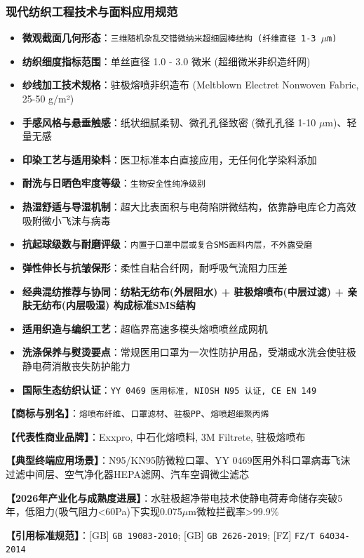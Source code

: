 \documentclass[11pt,openright,twoside,UTF8]{ctexbook}
\begin{document}
\subsubsection*{现代纺织工程技术与面料应用规范}
\begin{itemize} \setlength{\itemsep}{2pt}
    \item \textbf{微观截面几何形态}：\texttt{三维随机杂乱交错微纳米超细圆棒结构 (纤维直径 1-3 $\mu$m)}
    \item \textbf{纺织细度指标范围}：单丝直径 1.0 - 3.0 微米 (超细微米非织造纤网)
    \item \textbf{纱线加工技术规格}：驻极熔喷非织造布 (Meltblown Electret Nonwoven Fabric, 25-50 g/m²)
    \item \textbf{手感风格与悬垂触感}：纸状细腻柔韧、微孔孔径致密 (微孔孔径 1-10 $\mu$m)、轻量无感
    \item \textbf{印染工艺与适用染料}：医卫标准本白直接应用，无任何化学染料添加
    \item \textbf{耐洗与日晒色牢度等级}：\texttt{生物安全性纯净级别}
    \item \textbf{热湿舒适与导湿机制}：超大比表面积与电荷陷阱微结构，依靠静电库仑力高效吸附微小飞沫与病毒
    \item \textbf{抗起球级数与耐磨评级}：\texttt{内置于口罩中层或复合SMS面料内层，不外露受磨}
    \item \textbf{弹性伸长与抗皱保形}：柔性自粘合纤网，耐呼吸气流阻力压差
    \item \textbf{经典混纺推荐与协同}：\textbf{纺粘无纺布(外层阻水) + 驻极熔喷布(中层过滤) + 亲肤无纺布(内层吸湿) 构成标准SMS结构}
    \item \textbf{适用织造与编织工艺}：超临界高速多模头熔喷喷丝成网机
    \item \textbf{洗涤保养与熨烫要点}：常规医用口罩为一次性防护用品，受潮或水洗会使驻极静电荷消散丧失防护能力
    \item \textbf{国际生态纺织认证}：\texttt{YY 0469 医用标准, NIOSH N95 认证, CE EN 149}
\end{itemize}
\vspace{0.2cm}

\noindent\textbf{【商标与别名】}：\texttt{熔喷布纤维}、\texttt{口罩滤材}、\texttt{驻极PP}、\texttt{熔喷超细聚丙烯}\par
\noindent\textbf{【代表性商业品牌】}：Exxpro, 中石化熔喷料, 3M Filtrete, 驻极熔喷布\par
\noindent\textbf{【典型终端应用场景】}：N95/KN95防微粒口罩、YY 0469医用外科口罩病毒飞沫过滤中间层、空气净化器HEPA滤网、汽车空调微尘滤芯\par
\noindent\textbf{【2026年产业化与成熟度进展】}：水驻极超净带电技术使静电荷寿命储存突破5年，低阻力(吸气阻力\textless{}60Pa)下实现0.075$\mu$m微粒拦截率\textgreater{}99.9\%\par
\noindent\textbf{【引用标准规范】}：[GB] \texttt{GB 19083-2010}; [GB] \texttt{GB 2626-2019}; [FZ] \texttt{FZ/T 64034-2014}\par
\vspace{0.5cm}
\end{document}
